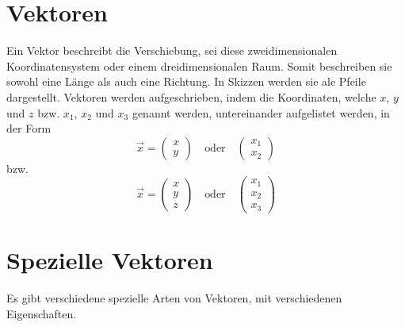 \documentclass{article}
\begin{document}
 
\newcommand{\norm}[1]{\left| {#1} \right|}  
\newcommand{\vect}[1]{\overrightarrow{#1}} 
 
\section{Vektoren}
Ein Vektor beschreibt die Verschiebung, sei diese zweidimensionalen Koordinatensystem oder einem dreidimensionalen Raum. Somit beschreiben sie sowohl eine Länge als auch eine Richtung. In Skizzen werden sie ale Pfeile dargestellt. Vektoren werden aufgeschrieben, indem die Koordinaten, welche $x$, $y$ und $z$ bzw. $x_1$, $x_2$ und $x_3$ genannt werden, untereinander aufgelistet werden, in der Form 
\[
 \vect{x} = \begin{pmatrix} x \\ y \end{pmatrix}
 \quad \text{oder} \quad
 \begin{pmatrix} x_1 \\ x_2 \end{pmatrix}
\]
bzw. 
\[
 \vect{x} = \begin{pmatrix} x \\ y \\ z \end{pmatrix}
 \quad \text{oder} \quad
 \begin{pmatrix} x_1 \\ x_2 \\ x_3 \end{pmatrix}
\]
  
\section{Spezielle Vektoren}
Es gibt verschiedene spezielle Arten von Vektoren, mit verschiedenen Eigenschaften. 
 
\end{document}
